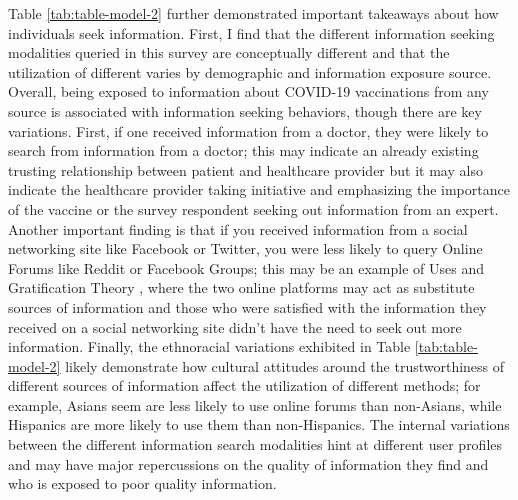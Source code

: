 Table \ref{tab:table-model-2} further demonstrated important takeaways about how
individuals seek information. First, I find that the different information
seeking modalities queried in this survey are conceptually different and that
the utilization of different varies by demographic and information exposure
source. Overall, being exposed to information about COVID-19 vaccinations from
any source is associated with information seeking behaviors, though there are
key variations. First, if one received information from a doctor, they were
likely to search from information from a doctor; this may indicate an already
existing trusting relationship between patient and healthcare provider but it
may also indicate the healthcare provider taking initiative and emphasizing the
importance of the vaccine or the survey respondent seeking out information from
an expert. Another important finding is that if you received information from a
social networking site like Facebook or Twitter, you were less likely to query
Online Forums like Reddit or Facebook Groups; this may be an example of Uses and
Gratification Theory \citep{blumlerUsesMassCommunications1974}, where the two
online platforms may act as substitute sources of information and those who were
satisfied with the information they received on a social networking site didn't
have the need to seek out more information. Finally, the ethnoracial variations
exhibited in Table \ref{tab:table-model-2} likely demonstrate how cultural
attitudes around the trustworthiness of different sources of information affect
the utilization of different methods; for example, Asians seem are less likely
to use online forums than non-Asians, while Hispanics are more likely to use
them than non-Hispanics. The internal variations between the different
information search modalities hint at different user profiles and may have major
repercussions on the quality of information they find and who is exposed to poor
quality information.

